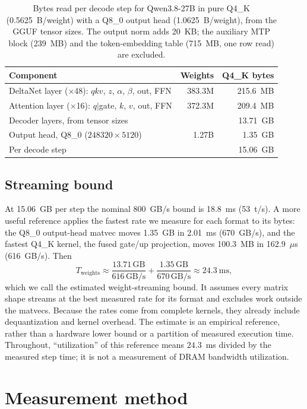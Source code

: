 \documentclass[11pt]{article}
\newcommand{\tps}{t/s}
\begin{document}
\begin{table}[t]
\centering
\begin{tabular}{lrr}
\toprule
Component & Weights & Q4\_K bytes \\
\midrule
DeltaNet layer ($\times$48): $qkv$, $z$, $\alpha$, $\beta$, out, FFN & 383.3M & 215.6~MB \\
Attention layer ($\times$16): $q|$gate, $k$, $v$, out, FFN & 372.3M & 209.4~MB \\
Decoder layers, from tensor sizes & & 13.71~GB \\
Output head, Q8\_0 ($248320\times5120$) & 1.27B & 1.35~GB \\
\midrule
Per decode step & & 15.06~GB \\
\bottomrule
\end{tabular}
\caption{Bytes read per decode step for Qwen3.8-27B in pure Q4\_K
(0.5625~B/weight) with a Q8\_0 output head (1.0625~B/weight), from the GGUF
tensor sizes. The output norm adds 20~KB; the auxiliary MTP block (239~MB) and
the token-embedding table (715~MB, one row read) are excluded.}
\label{tab:bytes}
\end{table}

\subsection{Streaming bound}
\label{sec:roofline}
At 15.06~GB per step the nominal 800~GB/s bound is 18.8~ms (53~\tps{}). A
more useful reference applies the fastest rate we measure for each format to
its bytes: the Q8\_0 output-head matvec moves 1.35~GB in 2.01~ms (670~GB/s),
and the fastest Q4\_K kernel, the fused gate/up projection, moves 100.3~MB in
162.9~$\mu$s (616~GB/s). Then
\[
T_{\text{weights}} \approx \frac{13.71\,\text{GB}}{616\,\text{GB/s}} + \frac{1.35\,\text{GB}}{670\,\text{GB/s}} \approx 24.3\ \text{ms},
\]
which we call the estimated weight-streaming bound. It assumes every matrix
shape streams at the best measured rate for its format and excludes work
outside the matvecs. Because the rates come from complete kernels, they
already include dequantization and kernel overhead. The estimate is an
empirical reference, rather than a hardware lower bound or a partition of
measured execution time. Throughout, ``utilization'' of this reference means
$24.3$~ms divided by the measured step time; it is not a measurement of DRAM
bandwidth utilization.

\section{Measurement method}
\label{sec:method}
\end{document}
